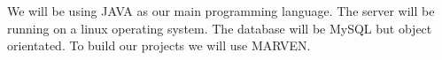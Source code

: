 We will be using JAVA as our main programming language. The server will be running on a linux operating system. The database will be MySQL but object orientated. To build our projects we will use MARVEN.

